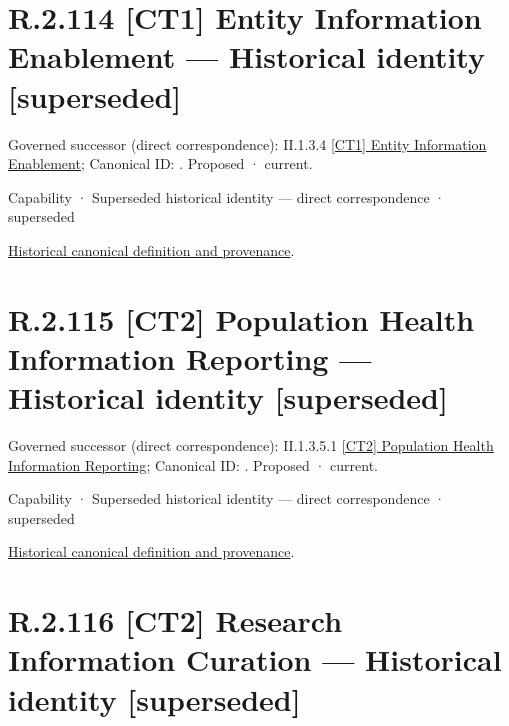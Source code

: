 \section*{R.2.114 [CT1] Entity Information Enablement — Historical identity [superseded]}
\label{navigation:R.2.114}

{\small Governed successor (direct correspondence): II.1.3.4 \hyperref[element:b5a92874f8ac4509a30af5253590edc1]{[CT1] Entity Information Enablement}; Canonical ID: \texttt{}. Proposed · current.}\par
\label{element:e4d959d6c71d498c9ce00d2be4c048e3}
{\small Capability · Superseded historical identity — direct correspondence · superseded}\par
\href{../../../../../../../continuum/strategy/capability/e4d959d6c71d498c9ce00d2be4c048e3.md}{Historical canonical definition and provenance}.\par
\section*{R.2.115 [CT2] Population Health Information Reporting — Historical identity [superseded]}
\label{navigation:R.2.115}

{\small Governed successor (direct correspondence): II.1.3.5.1 \hyperref[element:2135b45eab034370b0063b20e821985d]{[CT2] Population Health Information Reporting}; Canonical ID: \texttt{}. Proposed · current.}\par
\label{element:ced472b2d1a54016878ee541de969d9b}
{\small Capability · Superseded historical identity — direct correspondence · superseded}\par
\href{../../../../../../../continuum/strategy/capability/ced472b2d1a54016878ee541de969d9b.md}{Historical canonical definition and provenance}.\par
\section*{R.2.116 [CT2] Research Information Curation — Historical identity [superseded]}
\label{navigation:R.2.116}

